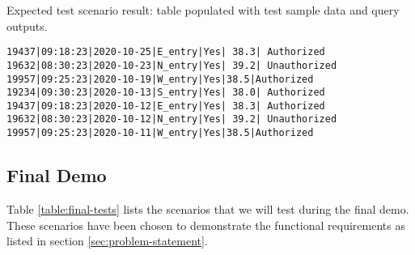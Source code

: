 \noindent
Expected test scenario result: table populated with test sample data and query
outputs.

\begin{lstlisting}
19437|09:18:23|2020-10-25|E_entry|Yes| 38.3| Authorized
19632|08:30:23|2020-10-23|N_entry|Yes| 39.2| Unauthorized
19957|09:25:23|2020-10-19|W_entry|Yes|38.5|Authorized
19234|09:30:23|2020-10-13|S_entry|Yes| 38.0| Authorized
19437|09:18:23|2020-10-12|E_entry|Yes| 38.3| Authorized
19632|08:30:23|2020-10-12|N_entry|Yes| 39.2| Unauthorized
19957|09:25:23|2020-10-11|W_entry|Yes|38.5|Authorized
\end{lstlisting}


\subsection{Final Demo}

Table \ref{table:final-tests} lists the scenarios that we will test during the
final demo. These scenarios have been chosen to demonstrate the functional
requirements as listed in section \ref{sec:problem-statement}.



